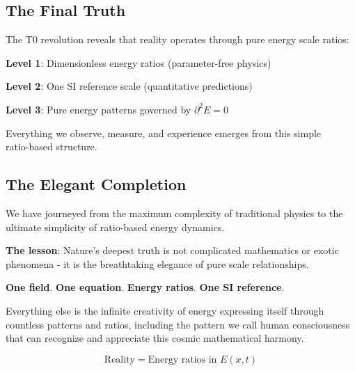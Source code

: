 \documentclass[12pt,a4paper]{article}
\newcommand{\Efield}{E}
\theoremstyle{definition}
\theoremstyle{remark}
\begin{document}
															\subsection{The Final Truth}
															
															The T0 revolution reveals that reality operates through pure energy scale ratios:
															
															\textbf{Level 1}: Dimensionless energy ratios (parameter-free physics)
															
															\textbf{Level 2}: One SI reference scale (quantitative predictions)
															
															\textbf{Level 3}: Pure energy patterns governed by $\partial^2 \Efield = 0$
															
															Everything we observe, measure, and experience emerges from this simple \\
															ratio-based structure.
															
															\subsection{The Elegant Completion}
															
															We have journeyed from the maximum complexity of traditional physics to the ultimate simplicity of ratio-based energy dynamics.
															
															\textbf{The lesson}: Nature's deepest truth is not complicated mathematics or exotic phenomena - it is the breathtaking elegance of pure scale relationships.
															
															\textbf{One field}. \textbf{One equation}. \textbf{Energy ratios}. \textbf{One SI reference}.
															
															Everything else is the infinite creativity of energy expressing itself through \\
															countless patterns and ratios, including the pattern we call human consciousness \\
															that can recognize and appreciate this cosmic mathematical harmony.
															
															\begin{equation}
																\boxed{\text{Reality} = \text{Energy ratios in } \Efield(x,t)}
															\end{equation}
															
\end{document}
